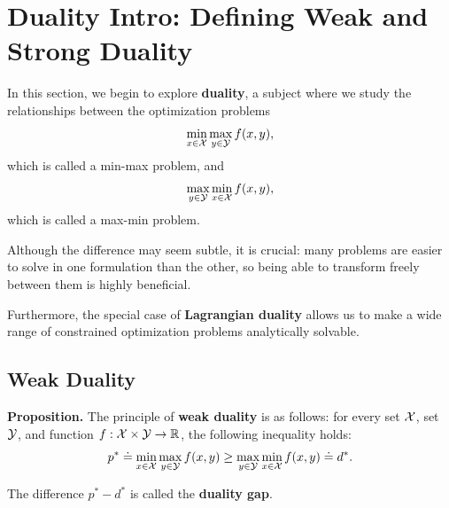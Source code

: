 \documentclass[12pt]{article}
\begin{document}
\pagebreak

\section{Duality Intro: Defining Weak and Strong Duality}

In this section, we begin to explore \textbf{duality}, a subject where we study the relationships between the optimization problems
%
\begin{equation*}
\min_{x \in {\mathcal X}} \max_{y \in {\mathcal Y}} f(x,y),
\end{equation*}
%
which is called a min-max problem, and
%
\begin{equation*}
\max_{y \in {\mathcal Y}} \min_{x \in {\mathcal X}} f(x,y),
\end{equation*}
%
which is called a max-min problem.

Although the difference may seem subtle, it is crucial: many problems are easier to solve in one formulation than the other, so being able to transform freely between them is highly beneficial. 

Furthermore, the special case of \textbf{Lagrangian duality} allows us to make a wide range of constrained optimization problems analytically solvable.

\subsection{Weak Duality}

\textbf{Proposition.} The principle of \textbf{weak duality} is as follows: for every set ${\mathcal X}$, set ${\mathcal Y}$, and function $f: {\mathcal X} \times {\mathcal Y} \to { {\mathbb R}^{} }$, the following inequality holds:
%
\begin{equation}
p^* \doteq \min_{x \in {\mathcal X}} \max_{y \in {\mathcal Y}} f(x,y) \geq \max_{y \in {\mathcal Y}} \min_{x \in {\mathcal X}} f(x,y) \doteq d^*.
\end{equation}

The difference $p^* - d^*$ is called the \textbf{duality gap}. 
\end{document}
